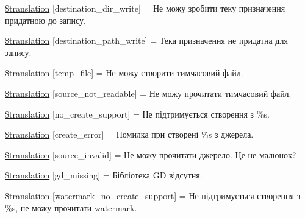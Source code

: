 \begin{DoxyCompactItemize}
\hyperlink{class_8upload_8uk___u_a_8php_a97608ea194a616db49141a0e6dee900c}{\$translation} \mbox{[}\textquotesingle{}destination\+\_\+dir\+\_\+write\textquotesingle{}\mbox{]} = \textquotesingle{}Не можу зробити теку призначення придатною до запису.\textquotesingle{}
\item 
\hyperlink{class_8upload_8uk___u_a_8php_a40e4e1962226b89fd76da5819a9602b0}{\$translation} \mbox{[}\textquotesingle{}destination\+\_\+path\+\_\+write\textquotesingle{}\mbox{]} = \textquotesingle{}Тека призначення не придатна для запису.\textquotesingle{}
\item 
\hyperlink{class_8upload_8uk___u_a_8php_a2baece8da11e20d45175db91851ec3e3}{\$translation} \mbox{[}\textquotesingle{}temp\+\_\+file\textquotesingle{}\mbox{]} = \textquotesingle{}Не можу створити тимчасовий файл.\textquotesingle{}
\item 
\hyperlink{class_8upload_8uk___u_a_8php_a922967ca2df0efdd455261142d8e5715}{\$translation} \mbox{[}\textquotesingle{}source\+\_\+not\+\_\+readable\textquotesingle{}\mbox{]} = \textquotesingle{}Не можу прочитати тимчасовий файл.\textquotesingle{}
\item 
\hyperlink{class_8upload_8uk___u_a_8php_a346dfd1ade29f583dd20d345c436859f}{\$translation} \mbox{[}\textquotesingle{}no\+\_\+create\+\_\+support\textquotesingle{}\mbox{]} = \textquotesingle{}Не підтримується створення з \%s.\textquotesingle{}
\item 
\hyperlink{class_8upload_8uk___u_a_8php_a53013ce9255c4e1849098ddd9fdb2b3f}{\$translation} \mbox{[}\textquotesingle{}create\+\_\+error\textquotesingle{}\mbox{]} = \textquotesingle{}Помилка при створені \%s з джерела.\textquotesingle{}
\item 
\hyperlink{class_8upload_8uk___u_a_8php_a6ab0a660b457eaf2d3434b225449fdd6}{\$translation} \mbox{[}\textquotesingle{}source\+\_\+invalid\textquotesingle{}\mbox{]} = \textquotesingle{}Не можу прочитати джерело. Це не малюнок?\textquotesingle{}
\item 
\hyperlink{class_8upload_8uk___u_a_8php_a7f3dfcc0db4bbc0f2e7210c439798e56}{\$translation} \mbox{[}\textquotesingle{}gd\+\_\+missing\textquotesingle{}\mbox{]} = \textquotesingle{}Бібліотека G\+D відсутня.\textquotesingle{}
\item 
\hyperlink{class_8upload_8uk___u_a_8php_a82d5853430ab72dc1f9799ec36144cc6}{\$translation} \mbox{[}\textquotesingle{}watermark\+\_\+no\+\_\+create\+\_\+support\textquotesingle{}\mbox{]} = \textquotesingle{}Не підтримується створення з \%s, не можу прочитати watermark.\textquotesingle{}
\item 

\end{DoxyCompactItemize}

